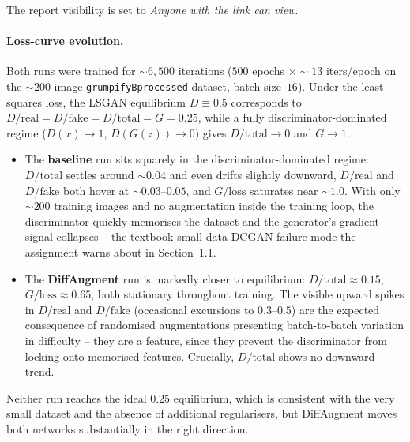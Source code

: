 \documentclass[11pt,a4paper]{article}
\begin{document}
\begin{center}
\end{center}

The report visibility is set to \emph{Anyone with the link can view}.

\paragraph{Loss-curve evolution.}
Both runs were trained for $\sim\!6{,}500$ iterations
($500$ epochs $\times \sim\!13$ iters/epoch on the $\sim\!200$-image
\texttt{grumpifyBprocessed} dataset, batch size~$16$). Under the
least-squares loss, the LSGAN equilibrium $D\!\equiv\!0.5$ corresponds
to $D/\text{real}\!=\!D/\text{fake}\!=\!D/\text{total}\!=\!G\!=\!0.25$,
while a fully discriminator-dominated regime
($D(x)\!\to\!1$, $D(G(z))\!\to\!0$) gives $D/\text{total}\!\to\!0$ and
$G\!\to\!1$.
\begin{itemize}[leftmargin=1.5em]
    \item The \textbf{baseline} run sits squarely in the
          discriminator-dominated regime: $D/\text{total}$ settles
          around $\sim\!0.04$ and even drifts slightly downward,
          $D/\text{real}$ and $D/\text{fake}$ both hover at
          $\sim\!0.03$--$0.05$, and $G/\text{loss}$ saturates near
          $\sim\!1.0$. With only $\sim\!200$ training images and no
          augmentation inside the training loop, the discriminator
          quickly memorises the dataset and the generator's gradient
          signal collapses -- the textbook small-data DCGAN failure
          mode the assignment warns about in Section~1.1.
    \item The \textbf{DiffAugment} run is markedly closer to
          equilibrium: $D/\text{total}\!\approx\!0.15$,
          $G/\text{loss}\!\approx\!0.65$, both stationary throughout
          training. The visible upward spikes in $D/\text{real}$ and
          $D/\text{fake}$ (occasional excursions to $0.3$--$0.5$) are
          the expected consequence of randomised augmentations
          presenting batch-to-batch variation in difficulty -- they
          are a feature, since they prevent the discriminator from
          locking onto memorised features. Crucially, $D/\text{total}$
          shows no downward trend.
\end{itemize}
Neither run reaches the ideal $0.25$ equilibrium, which is consistent
with the very small dataset and the absence of additional regularisers,
but DiffAugment moves both networks substantially in the right
direction.
\end{document}
